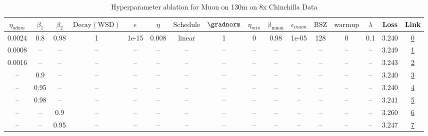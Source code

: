 \begin{table}[H]
\centering
\caption{Hyperparameter ablation for Muon on 130m on 8x Chinchilla Data}
\label{tab:ablation_muon_130m_on_8x_chinchilla_data}
\begin{tabular}{cccccccccccccccc}
\toprule
$\eta_{adam}$ & $\beta_1$ & $\beta_2$ & $\mathrm{Decay (WSD)}$ & $\epsilon$ & $\eta$ & $\mathrm{Schedule}$ & $\gradnorm$ & $\eta_{min}$ & $\mathrm{\beta_{muon}}$ & $\epsilon_{muon}$ & $\mathrm{BSZ}$ & $\mathrm{warmup}$ & $\lambda$ & Loss & Link \\
\midrule
0.0024 & 0.8 & 0.98 & 1 & 1e-15 & 0.008 & linear & 1 & 0 & 0.98 & 1e-05 & 128 & 0 & 0.1 & 3.240 & \href{https://wandb.ai/stanford-mercury/optimizer-scaling/runs/sweep-130m-21B-muon9841d7lr0.008-wd0.1-minlr0-warmup0-b10.8-b20.-6269f2}{0} \\
\midrule
0.0008 & -- & -- & -- & -- & -- & -- & -- & -- & -- & -- & -- & -- & -- & 3.249 & \href{https://wandb.ai/stanford-mercury/optimizer-scaling/runs/sweep-130m-21B-muondf893alr0.008-wd0.1-minlr0-warmup0-b10.8-b20.-9ec54b}{1} \\
0.0016 & -- & -- & -- & -- & -- & -- & -- & -- & -- & -- & -- & -- & -- & 3.243 & \href{https://wandb.ai/stanford-mercury/optimizer-scaling/runs/sweep-130m-21B-muon5db4falr0.008-wd0.1-minlr0-warmup0-b10.8-b20.-642691}{2} \\
-- & 0.9 & -- & -- & -- & -- & -- & -- & -- & -- & -- & -- & -- & -- & 3.240 & \href{https://wandb.ai/stanford-mercury/optimizer-scaling/runs/sweep-130m-21B-muon84cfa5lr0.008-wd0.1-minlr0-warmup0-b10.9-b20.-e91d3e}{3} \\
-- & 0.95 & -- & -- & -- & -- & -- & -- & -- & -- & -- & -- & -- & -- & 3.240 & \href{https://wandb.ai/stanford-mercury/optimizer-scaling/runs/sweep-130m-21B-muon0df321lr0.008-wd0.1-minlr0-warmup0-b10.95-b20-df585f}{4} \\
-- & 0.98 & -- & -- & -- & -- & -- & -- & -- & -- & -- & -- & -- & -- & 3.241 & \href{https://wandb.ai/stanford-mercury/optimizer-scaling/runs/sweep-130m-21B-muonfd2768lr0.008-wd0.1-minlr0-warmup0-b10.98-b20-ee9b19}{5} \\
-- & -- & 0.9 & -- & -- & -- & -- & -- & -- & -- & -- & -- & -- & -- & 3.260 & \href{https://wandb.ai/stanford-mercury/optimizer-scaling/runs/sweep-130m-21B-muon6d8811lr0.008-wd0.1-minlr0-warmup0-b10.8-b20.-2cfe0a}{6} \\
-- & -- & 0.95 & -- & -- & -- & -- & -- & -- & -- & -- & -- & -- & -- & 3.247 & \href{https://wandb.ai/stanford-mercury/optimizer-scaling/runs/sweep-130m-21B-muon8b9bb9lr0.008-wd0.1-minlr0-warmup0-b10.8-b20.-74bf2d}{7} \\

\end{tabular}
\end{table}
